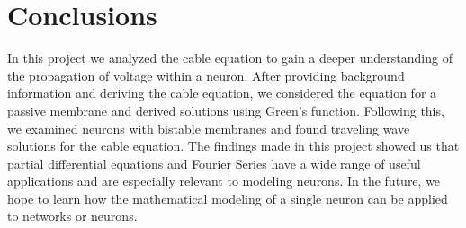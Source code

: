 \documentclass{article}
\begin{document}
\section{Conclusions}
In this project we analyzed the cable equation to gain a deeper understanding of the propagation of voltage within a neuron. After providing background information and deriving the cable equation, we considered the equation for a passive membrane and derived solutions using Green's function. Following this, we examined neurons with bistable membranes and found traveling wave solutions for the cable equation. The findings made in this project showed us that partial differential equations and Fourier Series have a wide range of useful applications and are especially relevant to modeling neurons. In the future, we hope to learn how the mathematical modeling of a single neuron can be applied to networks or neurons.

\printbibliography[
heading=bibintoc,
title={References}
]

\newpage
\end{document}
